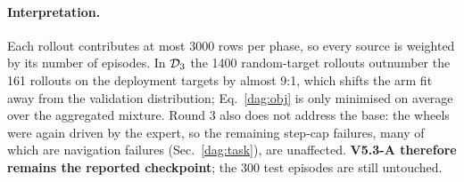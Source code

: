 \paragraph{Interpretation.} Each rollout contributes at most 3000 rows per phase, so every source is weighted by its number of episodes. In $\mathcal{D}_3$ the 1400 random-target rollouts outnumber the 161 rollouts on the deployment targets by almost 9:1, which shifts the arm fit away from the validation distribution; Eq.~\eqref{dag:obj} is only minimised on average over the aggregated mixture. Round 3 also does not address the base: the wheels were again driven by the expert, so the remaining step-cap failures, many of which are navigation failures (Sec.~\ref{dag:task}), are unaffected. \textbf{V5.3-A therefore remains the reported checkpoint}; the 300 test episodes are still untouched.
